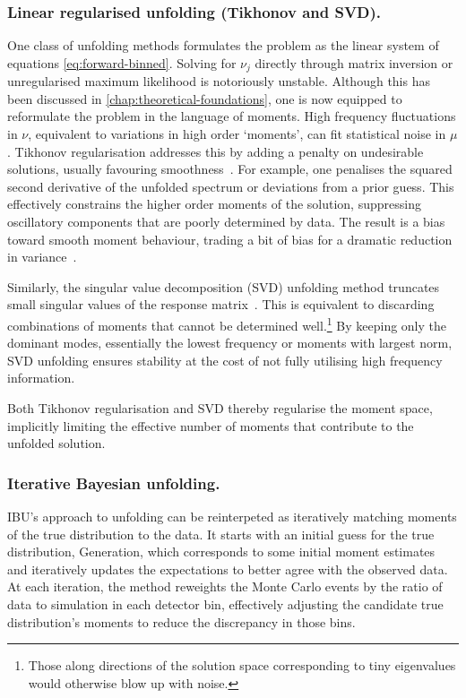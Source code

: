 {{        \subsubsection{Linear regularised unfolding (Tikhonov and SVD).}
            One class of unfolding methods formulates the problem as the linear system of equations \cref{eq:forward-binned}.
            Solving for $\nu_j$ directly through matrix inversion or unregularised maximum likelihood is notoriously unstable.
            Although this has been discussed in \cref{chap:theoretical-foundations}, one is now equipped to reformulate the problem in the language of moments.
            High frequency fluctuations in $\nu$, equivalent to variations in high order `moments', can fit statistical noise in $\mu$.
            Tikhonov regularisation addresses this by adding a penalty on undesirable solutions, usually favouring smoothness~\cite{zbMATH03227378}.
            For example, one penalises the squared second derivative of the unfolded spectrum or deviations from a prior guess.
            This effectively constrains the higher order moments of the solution, suppressing oscillatory components that are poorly determined by data.
            The result is a bias toward smooth moment behaviour, trading a bit of bias for a dramatic reduction in variance~\cite{Blobel:2002pu}.
            
            Similarly, the singular value decomposition (SVD) unfolding method truncates small singular values of the response matrix~\cite{Schmelling:1993cd}.
            This is equivalent to discarding combinations of moments that cannot be determined well.\footnote{Those along directions of the solution space corresponding to tiny eigenvalues would otherwise blow up with noise.}
            By keeping only the dominant modes, essentially the lowest frequency or moments with largest norm, SVD unfolding ensures stability at the cost of not fully utilising high frequency information.
            
            Both Tikhonov regularisation and SVD thereby regularise the moment space, implicitly limiting the effective number of moments that contribute to the unfolded solution.
            
        \subsubsection{Iterative Bayesian unfolding.}
            IBU's approach to unfolding can be reinterpeted as iteratively matching moments of the true distribution to the data.
            It starts with an initial guess for the true distribution, Generation, which corresponds to some initial moment estimates and iteratively updates the expectations to better agree with the observed data.
            At each iteration, the method reweights the Monte Carlo events by the ratio of data to simulation in each detector bin, effectively adjusting the candidate true distribution's moments to reduce the discrepancy in those bins.
            
}}
